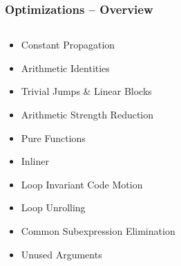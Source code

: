 \documentclass[navbaroff,en]{sdqbeamer}
\begin{document}
\begin{frame}
	\frametitle{Optimizations -- Overview}

	\begin{columns}
		\begin{column}{0.48\textwidth}
			\begin{itemize}
				\item Constant Propagation
				\item Arithmetic Identities
				\item Trivial Jumps \& Linear Blocks
				\item Arithmetic Strength Reduction
				\item Pure Functions
				\item Inliner
				\item Loop Invariant Code Motion
				\item Loop Unrolling
				\item Common Subexpression Elimination

				\vspace{1em}

				\item Unused Arguments
			\end{itemize}
		\end{column}
		\begin{column}{0.48\textwidth}
			


\end{column}
\end{columns}
\end{frame}
\end{document}
